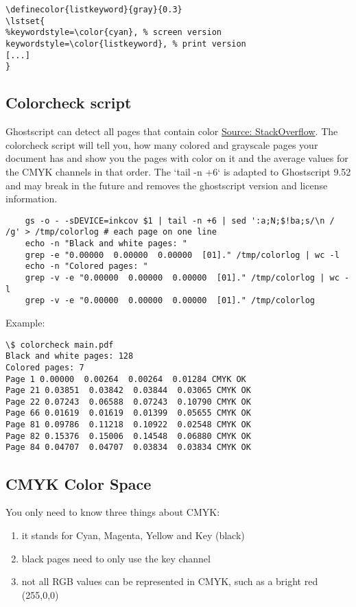 \begin{lstlisting}
\definecolor{listkeyword}{gray}{0.3}
\lstset{
%keywordstyle=\color{cyan}, % screen version
keywordstyle=\color{listkeyword}, % print version
[...]
}
\end{lstlisting}
  
\subsection{Colorcheck script}
Ghostscript can detect all pages that contain color \href{https://tex.stackexchange.com/questions/53493/detecting-all-pages-which-contain-color/61216\#61216}{Source: StackOverflow}.
The colorcheck script will tell you, how many colored and grayscale pages your document has and show you the pages with color on it and the average values for the CMYK channels in that order.
The `tail -n +6` is adapted to Ghostscript 9.52 and may break in the future and removes the ghostscript version and license information.

\begin{lstlisting}
    gs -o - -sDEVICE=inkcov $1 | tail -n +6 | sed ':a;N;$!ba;s/\n / /g' > /tmp/colorlog # each page on one line
    echo -n "Black and white pages: "
    grep -e "0.00000  0.00000  0.00000  [01]." /tmp/colorlog | wc -l
    echo -n "Colored pages: "
    grep -v -e "0.00000  0.00000  0.00000  [01]." /tmp/colorlog | wc -l
    grep -v -e "0.00000  0.00000  0.00000  [01]." /tmp/colorlog
\end{lstlisting}

Example:

\begin{lstlisting}
\$ colorcheck main.pdf
Black and white pages: 128
Colored pages: 7
Page 1 0.00000  0.00264  0.00264  0.01284 CMYK OK
Page 21 0.03851  0.03842  0.03844  0.03065 CMYK OK
Page 22 0.07243  0.06588  0.07243  0.10790 CMYK OK
Page 66 0.01619  0.01619  0.01399  0.05655 CMYK OK
Page 81 0.09786  0.11218  0.10922  0.02548 CMYK OK
Page 82 0.15376  0.15006  0.14548  0.06880 CMYK OK
Page 84 0.04707  0.04707  0.03834  0.03834 CMYK OK
\end{lstlisting}

\subsection{CMYK Color Space}
You only need to know three things about CMYK:

\begin{enumerate}
\item it stands for Cyan, Magenta, Yellow and Key (black)
\item black pages need to only use the key channel
\item not all RGB values can be represented in CMYK, such as a bright red (255,0,0)
\end{enumerate}

